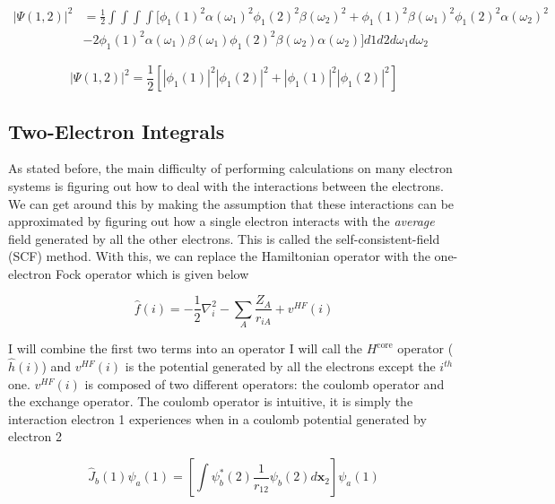 \begin{equation}
\label{eq:el_prob_dist_3}
\begin{split}
|\Psi(1,2)|^{2}	&	=
\frac{1}{2}\int\int\int\int
[
\phi_{1}(1)^{2}\alpha(\omega_{1})^{2}\phi_{1}(2)^{2}\beta(\omega_{2})^{2} +
\phi_{1}(1)^{2}\beta(\omega_{1})^{2}\phi_{1}(2)^{2}\alpha(\omega_{2})^{2}
	\\
	&	-2
\phi_{1}(1)^{2}\alpha(\omega_{1})\beta(\omega_{1})\phi_{1}(2)^{2}\beta(\omega_{2})\alpha(\omega_{2})
]d1d2d\omega_{1}d\omega_{2}
\end{split}
\end{equation}

\begin{equation}
\label{eq:el_prob_dist_4}
|\Psi(1,2)|^{2} =
\frac{1}{2}
\left[
|\phi_{1}(1)|^{2}|\phi_{1}(2)|^{2} + |\phi_{1}(1)|^{2}|\phi_{1}(2)|^{2}
\right]
\end{equation}

\subsection{Two-Electron Integrals}
As stated before, the main difficulty of performing calculations on many electron systems is figuring out how to deal with the interactions between the electrons. We can get around this by making the assumption that these interactions can be approximated by figuring out how a single electron interacts with the \textit{average} field generated by all the other electrons. This is called the self-consistent-field (SCF) method\cite{RHF}. With this, we can replace the Hamiltonian operator with the one-electron Fock operator which is given below\cite{Ostlund}

\begin{equation}
\label{eq:fock_op}
\hat{f}(i) = -\frac{1}{2}\nabla^{2}_{i}  - \sum_{A}\frac{Z_{A}}{r_{iA}} + v^{HF}(i)
\end{equation} 

I will combine the first two terms into an operator I will call the $H^{\text{core}}$ operator ($\hat{h}(i)$) and $v^{HF}(i)$ is the potential generated by all the electrons except the $i^{th}$ one. $v^{HF}(i)$ is composed of two different operators: the coulomb operator and the exchange operator. The coulomb operator is intuitive, it is simply the interaction electron 1 experiences when in a coulomb potential generated by electron 2

\begin{equation}
\label{eq:coulomb_op}
\hat{J}_{b}(1)\psi_{a}(1)=\left[\int\psi^{*}_{b}(2)\frac{1}{r_{12}}\psi_{b}(2)d\textbf{x}_{2}\right]\psi_{a}(1)
\end{equation} 

